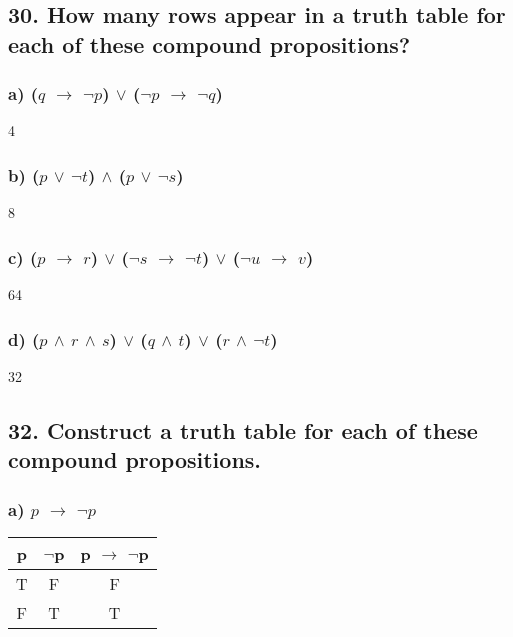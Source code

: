 \documentclass[11pt, oneside]{article} %
\numberwithin{equation}{section} %
\numberwithin{figure}{section} %
\numberwithin{table}{section} %
\begin{document}
\subsection{30. How many rows appear in a truth table for each of these
compound propositions?}
\subsubsection{a) ($q$ $\rightarrow$ $\neg$$p$) $\vee$ ($\neg$$p$ $\rightarrow$ $\neg$$q$)}
4
\subsubsection{b) ($p$ $\vee$ $\neg$$t$) $\wedge$ ($p$ $\vee$ $\neg$$s$)}
8
\subsubsection{c) ($p$ $\rightarrow$ $r$) $\vee$ ($\neg$$s$ $\rightarrow$ $\neg$$t$) $\vee$ ($\neg$$u$ $\rightarrow$ $v$)}
64
\subsubsection{d) ($p$ $\wedge$ $r$ $\wedge$ $s$) $\vee$ ($q$ $\wedge$ $t$) $\vee$ ($r$ $\wedge$ $\neg$$t$)}
32

\begin{table}[!htbp]
\subsection{32. Construct a truth table for each of these compound propositions.}
\subsubsection{a) $p$ $\rightarrow$ $\neg$$p$}
\begin{tabular}{c c c}
\hline\hline
p & $\neg$p &  p $\rightarrow$ $\neg$p \\ [0.5ex] 
\hline
T & F & F\\
F & T & T \\ [1ex]
\hline
\end{tabular}
\label{table:nonlin}
\end{table}
\end{document}
